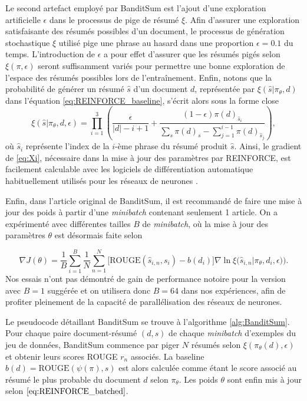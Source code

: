 Le second artefact employé par BanditSum est l'ajout d'une exploration artificielle
$\epsilon$ dans le processus de pige de résumé $\xi$.
Afin d'assurer une exploration satisfaisante des résumés possibles d'un document, le processus 
de génération stochastique $\xi$ utilisé pige une phrase au hasard dans une 
proportion $\epsilon=0.1$ du temps.
L'introduction de $\epsilon$ a pour effet d'assurer que les résumés pigés selon $\xi(\pi, \epsilon)$ seront 
suffisamment variés pour permettre une bonne exploration de l'espace des résumés possibles lors de
l'entraînement.
Enfin, notons que la probabilité de générer un résumé $\hat{s}$ d'un document $d$, représentée par
$\xi \left(\hat{s} | \pi_\theta, d \right)$ dans l'équation
\ref{eq:REINFORCE_baseline}, s'écrit alors sous la forme close
\begin{equation}
    \xi \left(\hat{s} | \pi_\theta, d, \epsilon \right) = \displaystyle \prod_{i=1}^3 \left(\dfrac{\epsilon}{|d| -i + 1}  + \dfrac{(1 - \epsilon)\pi(d)_{\hat{s}_i}}{\sum_s \pi(d)_s - \sum_{j=1}^{i-1} \pi(d)_{\hat{s}_j}}\right),
    \label{eq:Xi}
\end{equation}
où $\hat{s}_i$ représente l'index de la $i$-ème phrase du résumé produit $\hat{s}$. 
Ainsi, le gradient de \eqref{eq:Xi}, nécessaire dans la mise à jour des paramètres 
par REINFORCE, est facilement calculable avec les logiciels de différentiation automatique
habituellement utilisés pour les réseaux de neurones \citep{tensorflow2015-whitepaper,pytorch}.

Enfin, dans l'article original de BanditSum, il est recommandé 
de faire une mise à jour des poids à partir d'une \textit{minibatch} contenant 
seulement 1 article.
On a expérimenté avec différentes tailles $B$ de \textit{minibatch}, où la 
mise à jour des paramètres $\theta$ est désormais faite selon 

\begin{equation}
    \nabla J(\theta) = \frac{1}{B}\sum_{i=1}^B \frac{1}{N} \sum_{n=1}^N \big[\text{ROUGE}(\hat{s}_{i,n}, s_i) - b(d_i)\big]\nabla \ln \xi\big(\hat{s}_{i,n}| \pi_\theta, d_i, \epsilon)\big).
    \label{eq:REINFORCE_batched}
\end{equation}
Nos essais n'ont pas démontré de gain de performance notoire pour la version avec $B=1$
suggérée et on utilisera donc $B=64$ dans nos expériences, 
afin de profiter pleinement de la capacité de parallélisation 
des réseaux de neurones.

Le pseudocode détaillant BanditSum se trouve à l'algorithme 
\ref{alg:BanditSum}.
Pour chaque paire document-résumé $(d,s)$ de chaque \textit{minibatch} d'exemples 
du jeu de données, BanditSum commence par piger $N$ résumés selon $\xi(\pi_\theta(d), \epsilon)$
et obtenir leurs scores ROUGE $r_n$ associés.
La baseline $b(d)=\text{ROUGE}(\psi(\pi), s)$ est alors calculée comme étant le score associé au résumé
le plus probable du document $d$ selon $\pi_\theta$.
Les poids $\theta$ sont enfin mis à jour selon $\eqref{eq:REINFORCE_batched}$.

